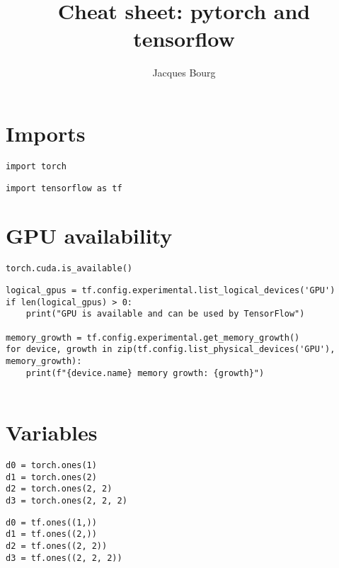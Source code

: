 \documentclass[24pt]{article}
\title{Cheat sheet: pytorch and tensorflow}
\author{Jacques Bourg}
\begin{document}
\maketitle

 


\section{Imports}

\begin{multicols}{2}
\begin{lstlisting}
import torch 
\end{lstlisting}

\begin{lstlisting}
import tensorflow as tf
\end{lstlisting}
\end{multicols}  
 
 
\section{GPU availability} 
 
\begin{multicols}{2}
\begin{lstlisting}
torch.cuda.is_available()
\end{lstlisting}
\columnbreak

\begin{lstlisting}
logical_gpus = tf.config.experimental.list_logical_devices('GPU')
if len(logical_gpus) > 0:
    print("GPU is available and can be used by TensorFlow")
    
memory_growth = tf.config.experimental.get_memory_growth()
for device, growth in zip(tf.config.list_physical_devices('GPU'), memory_growth):
    print(f"{device.name} memory growth: {growth}")    
    
\end{lstlisting}
\end{multicols}  
  
\section{Variables} 
 
\begin{multicols}{2}
\begin{lstlisting}
d0 = torch.ones(1)
d1 = torch.ones(2)
d2 = torch.ones(2, 2)
d3 = torch.ones(2, 2, 2)
\end{lstlisting}
\columnbreak

\begin{lstlisting}
d0 = tf.ones((1,))
d1 = tf.ones((2,))
d2 = tf.ones((2, 2))
d3 = tf.ones((2, 2, 2))
\end{lstlisting}
\end{multicols} 
 
\end{document}
